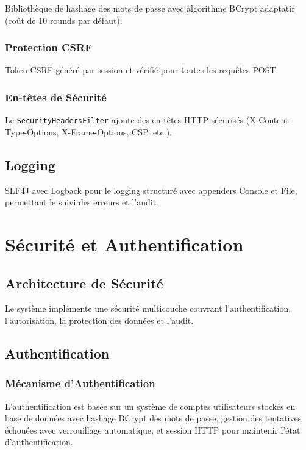 \documentclass[12pt,a4paper,twoside]{report}
\begin{document}
Bibliothèque de hashage des mots de passe avec algorithme BCrypt adaptatif (coût de 10 rounds par défaut).

\subsection{Protection CSRF}

Token CSRF généré par session et vérifié pour toutes les requêtes POST.

\subsection{En-têtes de Sécurité}

Le \texttt{SecurityHeadersFilter} ajoute des en-têtes HTTP sécurisés (X-Content-Type-Options, X-Frame-Options, CSP, etc.).

\section{Logging}

SLF4J avec Logback pour le logging structuré avec appenders Console et File, permettant le suivi des erreurs et l'audit.

\chapter{Sécurité et Authentification}

\section{Architecture de Sécurité}

Le système implémente une sécurité multicouche couvrant l'authentification, l'autorisation, la protection des données et l'audit.

\section{Authentification}

\subsection{Mécanisme d'Authentification}

L'authentification est basée sur un système de comptes utilisateurs stockés en base de données avec hashage BCrypt des mots de passe, gestion des tentatives échouées avec verrouillage automatique, et session HTTP pour maintenir l'état d'authentification.
\end{document}
